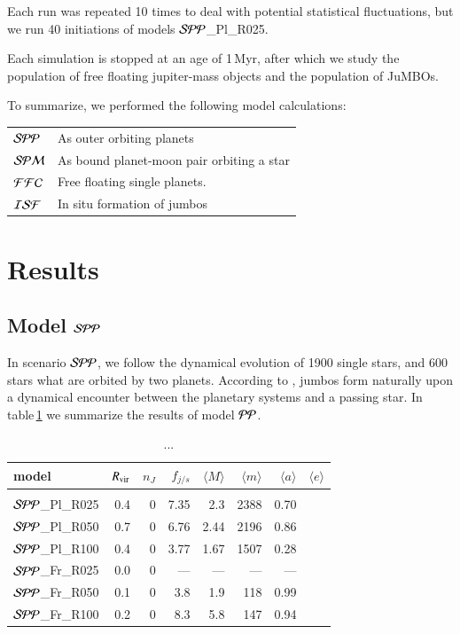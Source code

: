 \documentclass[aa]{lib/aa}
\newcommand{\jumbos}{\mbox{JuMBOs}}
\begin{document}
Each run was repeated 10 times to deal with potential statistical
fluctuations, but we run 40 initiations of models ${\cal SPP}$\_Pl\_R025.

Each simulation is stopped at an age of 1\,Myr, after which we study
the population of free floating jupiter-mass objects and the
population of \jumbos.

To summarize, we performed the following model calculations:\\
\begin{tabular}{ll}
${\cal SPP}$ & As outer orbiting planets\\
${\cal SPM}$ & As bound planet-moon pair orbiting a star\\
${\cal FFC}$ & Free floating single planets.\\
${\cal ISF}$ & In situ formation of jumbos\\
\end{tabular}

\section{Results}

\subsection{Model ${\cal SPP}$}

In scenario ${\cal SPP}$, we follow the dynamical evolution of 1900
single stars, and 600 stars what are orbited by two planets.  According
to \cite{2023arXiv231006016W}, jumbos form naturally upon a dynamical
encounter between the planetary systems and a passing star.  In
table\,\ref{Tab:model_PP} we summarize the results of model ${\cal
  PP}$.

\begin{table}
 \caption{...}
 \label{Tab:model_PP}
 \centering 
 \begin{tabular}{lrrrrrrr}
 \hline\hline
model &$R_{\rm vir}$ & $n_J$ & $f_{j/s}$ & $\langle M \rangle$ & $\langle m \rangle$ & $\langle a \rangle$ & $\langle e \rangle$ \\
        \hline \vspace{-0.75em}\\
${\cal SPP}$\_Pl\_R025 & 0.4 &0& 7.35    & 2.3  & 2388 & 0.70 \\
${\cal SPP}$\_Pl\_R050 & 0.7 &0& 6.76    & 2.44 & 2196 & 0.86 \\
${\cal SPP}$\_Pl\_R100 & 0.4 &0& 3.77    & 1.67 & 1507 & 0.28 \\
${\cal SPP}$\_Fr\_R025 & 0.0 &0&  ---    & ---  &  --- & ---  \\			
${\cal SPP}$\_Fr\_R050 & 0.1 &0& 3.8     & 1.9  & 118  & 0.99 \\
${\cal SPP}$\_Fr\_R100 & 0.2 &0& 8.3     & 5.8  & 147  & 0.94 \\ 
 \hline
 \end{tabular}
\end{table}
\end{document}
